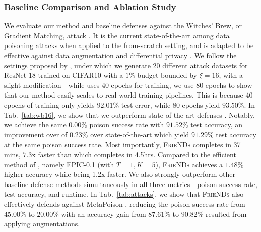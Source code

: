 \documentclass{article}
\newcommand{\alg}{\textsc{FrieNDs}}
\newcommand{\tabref}[1]{Tab.~\ref{#1}}
\begin{document}
\subsubsection{Baseline Comparison and Ablation Study}
We evaluate our method and baseline defenses against the Witches' Brew, or Gradient Matching, attack \citep{geiping2020witches}. It is the current state-of-the-art among data poisoning attacks when applied to the from-scratch setting, and is adapted to be effective against data augmentation and differential privacy \citep{geiping2021doesn}. 
We follow the settings proposed by \cite{geiping2021doesn}, under which we generate 20 different attack datasets for ResNet-18 trained on CIFAR10 with a $1\%$ budget bounded by $\xi = 16$, with a slight modification - while \cite{geiping2021doesn} uses 40 epochs for training, we use 80 epochs to show that our method easily scales to real-world training pipelines. This is because 40 epochs of training only yields $92.01\%$ test error, while 80 epochs yield $93.50\%$.
In \tabref{tab:wb16}, we show that we outperform state-of-the-art defenses \cite{chen2019detecting,geiping2021doesn,hong2020effectiveness,madry2018towards,peri2020deep,yang2022not}. Notably, we achieve the same $0.00\%$ poison success rate with $91.52\%$ test accuracy, an improvement over of $0.23\%$ over state-of-the-art \cite{geiping2021doesn} which yield $91.29\%$ test accuracy at the same poison success rate. Most importantly, \alg{} completes in 37 mins, $7.3$x faster than \cite{geiping2021doesn} which completes in 4.5hrs. 
Compared to the efficient method of \cite{yang2022not}, namely EPIC-0.1 {(with $T=1, K=5$)}, \alg{} achieves a $1.48\%$ higher accuracy while being 1.2x faster. We also strongly outperform other baseline defense methods simultaneously in all three metrics - poison success rate, test accuracy, and runtime. In \tabref{tab:attacks}, we show that \alg{} also effectively defends against MetaPoison \cite{huang2020metapoison}, reducing the poison success rate from $45.00\%$ to $20.00\%$ with an accuracy gain from $87.61\%$ to $90.82\%$ resulted from applying augmentations.
\end{document}

